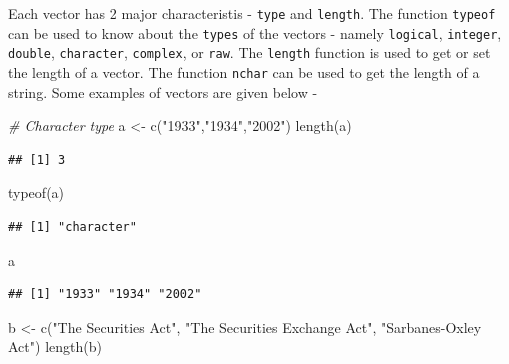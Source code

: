 \documentclass[
]{book}
\newenvironment{Shaded}{\begin{snugshade}}{\end{snugshade}}
\newcommand{\CommentTok}[1]{\textcolor[rgb]{0.56,0.35,0.01}{\textit{#1}}}
\newcommand{\FunctionTok}[1]{\textcolor[rgb]{0.00,0.00,0.00}{#1}}
\newcommand{\NormalTok}[1]{#1}
\newcommand{\OtherTok}[1]{\textcolor[rgb]{0.56,0.35,0.01}{#1}}
\newcommand{\StringTok}[1]{\textcolor[rgb]{0.31,0.60,0.02}{#1}}
\begin{document}
Each vector has 2 major characteristis - \texttt{type} and \texttt{length}. The function \texttt{typeof} can be used to know about the \texttt{types} of the vectors - namely \texttt{logical}, \texttt{integer}, \texttt{double}, \texttt{character}, \texttt{complex}, or \texttt{raw}. The \texttt{length} function is used to get or set the length of a vector. The function \texttt{nchar} can be used to get the length of a string. Some examples of vectors are given below -

\begin{Shaded}
\begin{Highlighting}[]
\CommentTok{\# Character type }
\NormalTok{a }\OtherTok{\textless{}{-}} \FunctionTok{c}\NormalTok{(}\StringTok{"1933"}\NormalTok{,}\StringTok{"1934"}\NormalTok{,}\StringTok{"2002"}\NormalTok{)}
\FunctionTok{length}\NormalTok{(a)}
\end{Highlighting}
\end{Shaded}

\begin{verbatim}
## [1] 3
\end{verbatim}

\begin{Shaded}
\begin{Highlighting}[]
\FunctionTok{typeof}\NormalTok{(a)}
\end{Highlighting}
\end{Shaded}

\begin{verbatim}
## [1] "character"
\end{verbatim}

\begin{Shaded}
\begin{Highlighting}[]
\NormalTok{a}
\end{Highlighting}
\end{Shaded}

\begin{verbatim}
## [1] "1933" "1934" "2002"
\end{verbatim}

\begin{Shaded}
\begin{Highlighting}[]
\NormalTok{b }\OtherTok{\textless{}{-}} \FunctionTok{c}\NormalTok{(}\StringTok{"The Securities Act"}\NormalTok{, }\StringTok{"The Securities Exchange Act"}\NormalTok{, }\StringTok{"Sarbanes{-}Oxley Act"}\NormalTok{)}
\FunctionTok{length}\NormalTok{(b)}
\end{Highlighting}
\end{Shaded}
\end{document}

